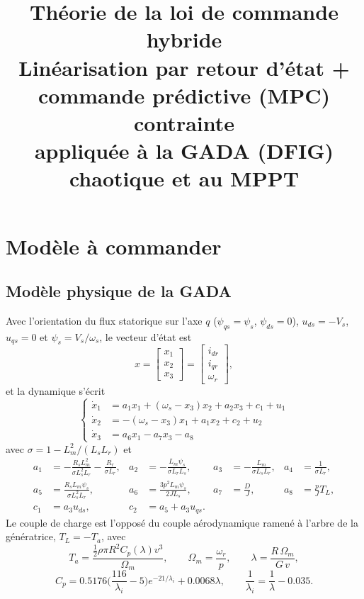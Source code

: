 \documentclass[11pt,a4paper]{article}
\title{Théorie de la loi de commande hybride\\ \large Linéarisation par retour d'état + commande prédictive (MPC) contrainte\\ appliquée à la GADA (DFIG) chaotique et au MPPT}
\author{}
\date{}
\begin{document}
\maketitle

\section{Modèle à commander}

\subsection{Modèle physique de la GADA}
Avec l'orientation du flux statorique sur l'axe $q$ ($\psi_{qs}=\psi_s$, $\psi_{ds}=0$), $u_{ds}=-V_s$, $u_{qs}=0$ et $\psi_s=V_s/\omega_s$, le vecteur d'état est
\[
x=\begin{bmatrix}x_1\\x_2\\x_3\end{bmatrix}=\begin{bmatrix}i_{dr}\\ i_{qr}\\ \omega_r\end{bmatrix},
\]
et la dynamique s'écrit
\begin{equation}
\left\{\begin{aligned}
\dot x_1 &= a_1x_1+(\omega_s-x_3)x_2+a_2x_3+c_1+u_1\\
\dot x_2 &= -(\omega_s-x_3)x_1+a_1x_2+c_2+u_2\\
\dot x_3 &= a_6x_1-a_7x_3-a_8
\end{aligned}\right.
\label{eq:modele}
\end{equation}
avec $\sigma=1-L_m^2/(L_sL_r)$ et
\begin{align*}
a_1&=-\frac{R_sL_m^2}{\sigma L_s^2L_r}-\frac{R_r}{\sigma L_r}, &
a_2&=-\frac{L_m\psi_s}{\sigma L_rL_s}, &
a_3&=-\frac{L_m}{\sigma L_sL_r}, &
a_4&=\frac{1}{\sigma L_r},\\
a_5&=\frac{R_sL_m\psi_s}{\sigma L_s^2L_r}, &
a_6&=\frac{3p^2L_m\psi_s}{2JL_s}, &
a_7&=\frac{D}{J}, &
a_8&=\frac{p}{J}T_L,\\
c_1&=a_3u_{ds}, & c_2&=a_5+a_3u_{qs}. & &
\end{align*}
Le couple de charge est l'opposé du couple aérodynamique ramené à l'arbre de la génératrice, $T_L=-T_a$, avec
\[
T_a=\frac{\tfrac12\rho\pi R^2C_p(\lambda)v^3}{\Omega_m},\qquad \Omega_m=\frac{\omega_r}{p},\qquad
\lambda=\frac{R\,\Omega_m}{G\,v},
\]
\[
C_p=0.5176\Big(\frac{116}{\lambda_i}-5\Big)e^{-21/\lambda_i}+0.0068\lambda,\qquad \frac1{\lambda_i}=\frac1\lambda-0.035 .
\]
\end{document}
